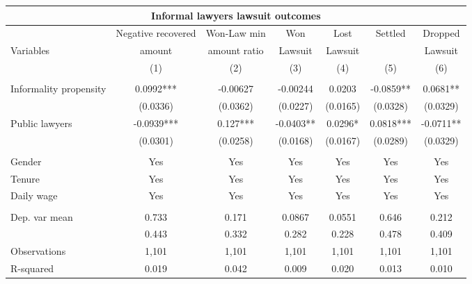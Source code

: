 
  \centering

    \begin{tabular}{lcccccc}
    \multicolumn{7}{c}{Informal lawyers lawsuit outcomes} \\
    \midrule
    \midrule
          & Negative recovered & Won-Law min & Won   & Lost  & Settled & Dropped \\
    Variables & amount & amount ratio & Lawsuit & Lawsuit &       & Lawsuit \\
    \midrule
          & (1)   & (2)   & (3)   & (4)   & (5)   & (6) \\
          &       &       &       &       &       &  \\
    Informality propensity & 0.0992*** & -0.00627 & -0.00244 & 0.0203 & -0.0859** & 0.0681** \\
          & (0.0336) & (0.0362) & (0.0227) & (0.0165) & (0.0328) & (0.0329) \\
    Public lawyers & -0.0939*** & 0.127*** & -0.0403** & 0.0296* & 0.0818*** & -0.0711** \\
          & (0.0301) & (0.0258) & (0.0168) & (0.0167) & (0.0289) & (0.0329) \\
          &       &       &       &       &       &  \\
    Gender & Yes   & Yes   & Yes   & Yes   & Yes   & Yes \\
    Tenure & Yes   & Yes   & Yes   & Yes   & Yes   & Yes \\
    Daily wage & Yes   & Yes   & Yes   & Yes   & Yes   & Yes \\
          &       &       &       &       &       &  \\
    \midrule
    Dep. var mean & 0.733 & 0.171 & 0.0867 & 0.0551 & 0.646 & 0.212 \\
          & 0.443 & 0.332 & 0.282 & 0.228 & 0.478 & 0.409 \\
    Observations & 1,101 & 1,101 & 1,101 & 1,101 & 1,101 & 1,101 \\
    R-squared & 0.019 & 0.042 & 0.009 & 0.020 & 0.013 & 0.010 \\
    \bottomrule
    \bottomrule
    \end{tabular}%
 
